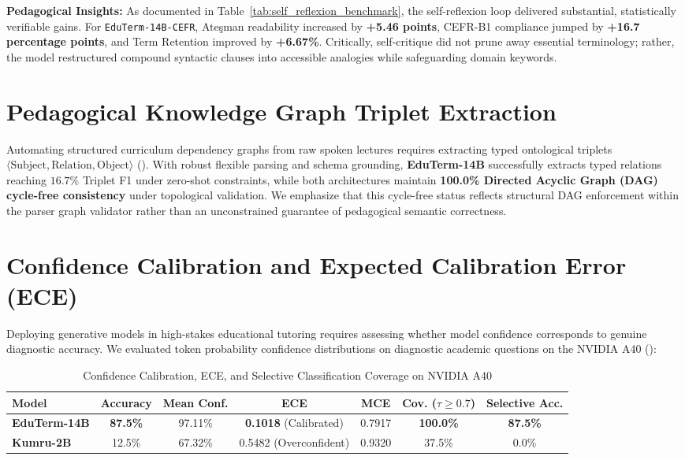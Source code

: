 \documentclass[a4paper,12pt]{report}
\begin{document}
\textbf{Pedagogical Insights:} As documented in Table~\ref{tab:self_reflexion_benchmark}, the self-reflexion loop delivered substantial, statistically verifiable gains. For \texttt{EduTerm-14B-CEFR}, Ateşman readability increased by \textbf{+5.46 points}, CEFR-B1 compliance jumped by \textbf{+16.7 percentage points}, and Term Retention improved by \textbf{+6.67\%}. Critically, self-critique did not prune away essential terminology; rather, the model restructured compound syntactic clauses into accessible analogies while safeguarding domain keywords.

\section{Pedagogical Knowledge Graph Triplet Extraction}
\label{sec:knowledge_graph}
Automating structured curriculum dependency graphs from raw spoken lectures requires extracting typed ontological triplets $\langle \text{Subject}, \text{Relation}, \text{Object} \rangle$ (). 
With robust flexible parsing and schema grounding, \textbf{EduTerm-14B} successfully extracts typed relations reaching $16.7\%$ Triplet F1 under zero-shot constraints, while both architectures maintain \textbf{100.0\% Directed Acyclic Graph (DAG) cycle-free consistency} under topological validation. We emphasize that this cycle-free status reflects structural DAG enforcement within the parser graph validator rather than an unconstrained guarantee of pedagogical semantic correctness.

\section{Confidence Calibration and Expected Calibration Error (ECE)}
\label{sec:calibration_ece}
Deploying generative models in high-stakes educational tutoring requires assessing whether model confidence corresponds to genuine diagnostic accuracy. We evaluated token probability confidence distributions on diagnostic academic questions on the NVIDIA A40 ():

\begin{table}[htbp]
\centering
\small
\caption{Confidence Calibration, ECE, and Selective Classification Coverage on NVIDIA A40}
\label{tab:calibration_ece}
\scriptsize\setlength{\tabcolsep}{2pt}
\begin{tabularx}{\textwidth}{>{\RaggedRight\arraybackslash}Xcccccc}
\hline
\textbf{Model} & \textbf{Accuracy} & \textbf{Mean Conf.} & \textbf{ECE} & \textbf{MCE} & \textbf{Cov. ($\tau \ge 0.7$)} & \textbf{Selective Acc.} \\
\hline
\textbf{EduTerm-14B} & \textbf{87.5\%} & 97.11\% & \textbf{0.1018} (Calibrated) & 0.7917 & \textbf{100.0\%} & \textbf{87.5\%} \\
\textbf{Kumru-2B} & 12.5\% & 67.32\% & 0.5482 (Overconfident) & 0.9320 & 37.5\% & 0.0\% \\
\hline
\end{tabularx}
\end{table}
\end{document}
